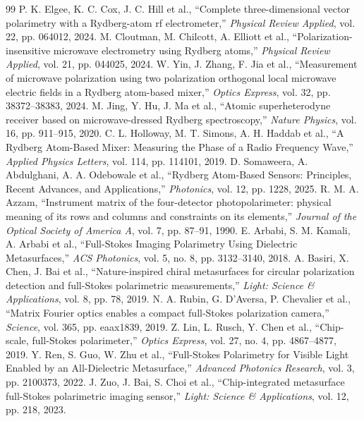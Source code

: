 \begin{thebibliography}{99}
 P. K. Elgee, K. C. Cox, J. C. Hill et al., ``Complete three-dimensional vector polarimetry with a Rydberg-atom rf electrometer,'' \emph{Physical Review Applied}, vol. 22, pp. 064012, 2024.
 M. Cloutman, M. Chilcott, A. Elliott et al., ``Polarization-insensitive microwave electrometry using Rydberg atoms,'' \emph{Physical Review Applied}, vol. 21, pp. 044025, 2024.
 W. Yin, J. Zhang, F. Jia et al., ``Measurement of microwave polarization using two polarization orthogonal local microwave electric fields in a Rydberg atom-based mixer,'' \emph{Optics Express}, vol. 32, pp. 38372--38383, 2024.
 M. Jing, Y. Hu, J. Ma et al., ``Atomic superheterodyne receiver based on microwave-dressed Rydberg spectroscopy,'' \emph{Nature Physics}, vol. 16, pp. 911--915, 2020.
 C. L. Holloway, M. T. Simons, A. H. Haddab et al., ``A Rydberg Atom-Based Mixer: Measuring the Phase of a Radio Frequency Wave,'' \emph{Applied Physics Letters}, vol. 114, pp. 114101, 2019.
 D. Somaweera, A. Abdulghani, A. A. Odebowale et al., ``Rydberg Atom-Based Sensors: Principles, Recent Advances, and Applications,'' \emph{Photonics}, vol. 12, pp. 1228, 2025.
 R. M. A. Azzam, ``Instrument matrix of the four-detector photopolarimeter: physical meaning of its rows and columns and constraints on its elements,'' \emph{Journal of the Optical Society of America A}, vol. 7, pp. 87--91, 1990.
 E. Arbabi, S. M. Kamali, A. Arbabi et al., ``Full-Stokes Imaging Polarimetry Using Dielectric Metasurfaces,'' \emph{ACS Photonics}, vol. 5, no. 8, pp. 3132--3140, 2018.
 A. Basiri, X. Chen, J. Bai et al., ``Nature-inspired chiral metasurfaces for circular polarization detection and full-Stokes polarimetric measurements,'' \emph{Light: Science \& Applications}, vol. 8, pp. 78, 2019.
 N. A. Rubin, G. D'Aversa, P. Chevalier et al., ``Matrix Fourier optics enables a compact full-Stokes polarization camera,'' \emph{Science}, vol. 365, pp. eaax1839, 2019.
 Z. Lin, L. Rusch, Y. Chen et al., ``Chip-scale, full-Stokes polarimeter,'' \emph{Optics Express}, vol. 27, no. 4, pp. 4867--4877, 2019.
 Y. Ren, S. Guo, W. Zhu et al., ``Full-Stokes Polarimetry for Visible Light Enabled by an All-Dielectric Metasurface,'' \emph{Advanced Photonics Research}, vol. 3, pp. 2100373, 2022.
 J. Zuo, J. Bai, S. Choi et al., ``Chip-integrated metasurface full-Stokes polarimetric imaging sensor,'' \emph{Light: Science \& Applications}, vol. 12, pp. 218, 2023.

\end{thebibliography}
